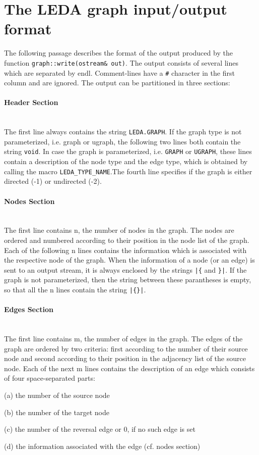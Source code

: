 
\section{The LEDA graph input/output format}\label{leda-format}

The following passage describes the format of the output produced by the
function {\tt graph::write(ostream\& out)}. The output consists of several lines
which are separated by endl. Comment-lines have a {\tt \#} character
in the first column and are ignored. The output can be partitioned in three
sections:

\paragraph{Header Section}\ \\
The first line always contains the string {\tt LEDA.GRAPH}. If the graph
type is not parameterized, i.e. graph or ugraph, the following two
lines both contain the string {\tt void}. In case the graph is parameterized,
i.e. {\tt GRAPH} or {\tt UGRAPH}, these lines contain a description
of the node type and the edge type, which is obtained by calling the
macro {\tt LEDA\_TYPE\_NAME}.The fourth line specifies if the graph is either 
directed (-1) or undirected (-2).

\paragraph{Nodes Section}\ \\
The first line contains n, the number of nodes in the graph. The nodes
are ordered and numbered according to their position in the node list
of the graph. Each of the following n lines contains the information
which is associated with the respective node of the graph. When the
information of a node (or an edge) is sent to an output stream, it is
always enclosed by the strings {\tt |\{} and {\tt \}|}. If the graph is not
parameterized, then the string between these parantheses is empty, so
that all the n lines contain the string {\tt |\{\}|}.

\paragraph{Edges Section}\ \\
The first line contains m, the number of edges in the graph. The edges
of the graph are ordered by two criteria: first according to the number
of their source node and second according to their position in the
adjacency list of the source node. Each of the next m lines contains
the description of an edge which consists of four space-separated
parts:
\begin{description}
\item{(a)} the number of the source node
\item{(b)} the number of the target node
\item{(c)} the number of the reversal edge or 0, if no such edge is set
\item{(d)} the information associated with the edge (cf. nodes section)
\end{description}

